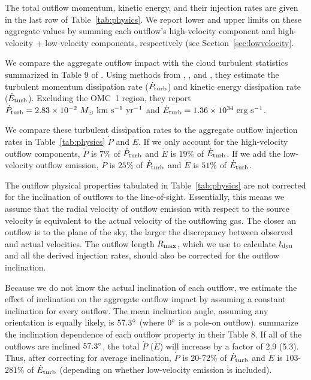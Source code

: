 \documentclass[twocolumn]{aastex63}
\begin{document}
The total outflow momentum, kinetic energy, and their injection rates are given in the last row of Table~\ref{tab:physics}. We report lower and upper limits on these aggregate values by summing each outflow's high-velocity component and high-velocity + low-velocity components, respectively (see Section~\ref{sec:lowvelocity}. 

We compare the aggregate outflow impact with the cloud turbulent statistics summarized in Table 9 of \citet{Tanabe:submitted}. Using methods from \citet{Mac-Low99}, \citet{McKee07}, and \citet{Li15}, they estimate the turbulent momentum dissipation rate ($\dot P_{\rm turb}$) and kinetic energy dissipation rate ($\dot E_{\rm turb}$). Excluding the OMC~1 region, they report $\dot P_{\rm turb}= 2.83\times10^{-2}~M_\odot~\rm{km}~\rm{s}^{-1}~\rm{yr}^{-1}$ and $\dot E_{\rm turb}=1.36\times10^{34}~\rm{erg}~\rm{s}^{-1}$.

We compare these turbulent dissipation rates to the aggregate outflow injection rates in Table~\ref{tab:physics} $\dot P$ and $\dot E$. If we only account for the high-velocity outflow components, $\dot P$ is $7\%$ of $\dot P_{\rm turb}$ and $\dot E$ is $19\%$ of $\dot E_{\rm turb}$. If we add the low-velocity outflow emission, $\dot P$ is $25\%$ of $\dot P_{\rm turb}$ and $\dot E$ is $51\%$ of $\dot E_{\rm turb}$.

The outflow physical properties tabulated in Table~\ref{tab:physics} are not corrected for the inclination of outflows to the line-of-sight. Essentially, this means we assume that the radial velocity of outflow emission with respect to the source velocity is equivalent to the actual velocity of the outflowing gas. The closer an outflow is to the plane of the sky, the larger the discrepancy between observed and actual velocities. The outflow length $R_{\rm max}$, which we use to calculate $t_{\rm dyn}$ and all the derived injection rates, should also be corrected for the outflow inclination.

Because we do not know the actual inclination of each outflow, we estimate the effect of inclination on the aggregate outflow impact by assuming a constant inclination for every outflow. The mean inclination angle, assuming any orientation is equally likely, is $57.3\mbox{$^\circ$}$ (where $0\mbox{$^\circ$}$ is a pole-on outflow). 
\citet{Dunham14} summarize the inclination dependence of each outflow property in their Table 8. If all of the outflows are inclined $57.3\mbox{$^\circ$}$, the total $\dot P$ ($\dot E$) will increase by a factor of 2.9 (5.3). Thus, after correcting for average inclination, $\dot P$ is  $20$-$72\%$ of $\dot P_{\rm turb}$ and $\dot E$ is $103$-$281\%$ of $\dot E_{\rm turb}$ (depending on whether low-velocity emission is included).
\end{document}
